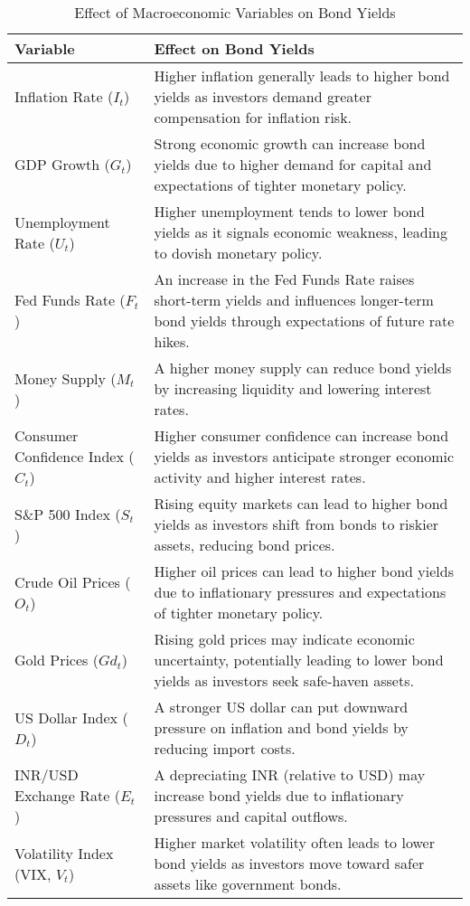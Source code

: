 \begin{table*}[h]
    \centering
    \renewcommand{\arraystretch}{1.2}
    \small
    \begin{tabular}{>{\raggedright\arraybackslash}p{3cm}p{10cm}}
        \toprule
        \textbf{Variable} & \textbf{Effect on Bond Yields} \\
        \midrule
        Inflation Rate ($I_t$) & Higher inflation generally leads to higher bond yields as investors demand greater compensation for inflation risk. \\
        GDP Growth ($G_t$) & Strong economic growth can increase bond yields due to higher demand for capital and expectations of tighter monetary policy. \\
        Unemployment Rate ($U_t$) & Higher unemployment tends to lower bond yields as it signals economic weakness, leading to dovish monetary policy. \\
        Fed Funds Rate ($F_t$) & An increase in the Fed Funds Rate raises short-term yields and influences longer-term bond yields through expectations of future rate hikes. \\
        Money Supply ($M_t$) & A higher money supply can reduce bond yields by increasing liquidity and lowering interest rates. \\
        Consumer Confidence Index ($C_t$) & Higher consumer confidence can increase bond yields as investors anticipate stronger economic activity and higher interest rates. \\
        S\&P 500 Index ($S_t$) & Rising equity markets can lead to higher bond yields as investors shift from bonds to riskier assets, reducing bond prices. \\
        Crude Oil Prices ($O_t$) & Higher oil prices can lead to higher bond yields due to inflationary pressures and expectations of tighter monetary policy. \\
        Gold Prices ($Gd_t$) & Rising gold prices may indicate economic uncertainty, potentially leading to lower bond yields as investors seek safe-haven assets. \\
        US Dollar Index ($D_t$) & A stronger US dollar can put downward pressure on inflation and bond yields by reducing import costs. \\
        INR/USD Exchange Rate ($E_t$) & A depreciating INR (relative to USD) may increase bond yields due to inflationary pressures and capital outflows. \\
        Volatility Index (VIX, $V_t$) & Higher market volatility often leads to lower bond yields as investors move toward safer assets like government bonds. \\
        \bottomrule
    \end{tabular}
    \caption{Effect of Macroeconomic Variables on Bond Yields}
    \label{tab:macro_effects}
\end{table*}

